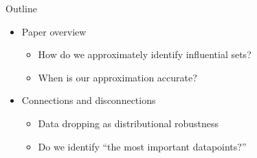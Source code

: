 

\begin{frame}{Outline}
\begin{itemize}
    \item Paper overview
    \begin{itemize}
        \item How do we approximately identify influential sets?  
        \item When is our approximation accurate?
    \end{itemize}
    \item Connections and disconnections
    \begin{itemize}
        \item Data dropping as distributional robustness
        \item Do we identify ``the most important datapoints?''
    \end{itemize}
\end{itemize}

\end{frame}







